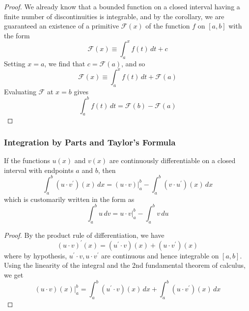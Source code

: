   \begin{proof}
    We already know that a bounded function on a closed interval having a finite number of discontinuities is integrable, and by the corollary, we are guaranteed an existence of a primitive $\mathcal{F}(x)$ of the function $f$ on $[a, b]$ with the form 
    \[\mathcal{F} (x) \equiv \int_a^x f(t)\,dt + c\]
    Setting $x = a$, we find that $c = \mathcal{F}(a)$, and so 
    \[\mathcal{F}(x) \equiv \int_a^x f(t)\,dt + \mathcal{F}(a)\]
    Evaluating $\mathcal{F}$ at $x = b$ gives
    \[\int_a^b f(t)\,dt = \mathcal{F}(b) - \mathcal{F}(a)\]
  \end{proof}

  \subsubsection{Integration by Parts and Taylor's Formula}
  \begin{theorem}
  If the functions $u(x)$ and $v(x)$ are continuously differentiable on a closed interval with endpoints $a$ and $b$, then
  \[\int_a^b (u \cdot v^\prime)(x)\,dx = (u \cdot v)\big|^b_a - \int_a^b (v \cdot u^\prime)(x)\,dx\]
  which is customarily written in the form as
  \[\int_a^b u\,dv = u \cdot v \big|_a^b - \int_a^b v\,du\]
  \end{theorem}
  \begin{proof}
  By the product rule of differentiation, we have
  \[(u \cdot v)^\prime (x) = (u^\prime \cdot v)(x) + (u \cdot v^\prime) (x)\]
  where by hypothesis, $u^\prime \cdot v, u \cdot v^\prime$ are continuous and hence integrable on $[a, b]$. Using the linearity of the integral and the 2nd fundamental theorem of calculus, we get
  \[(u \cdot v) (x) \big|^b_a = \int_a^b (u^\prime \cdot v)(x)\,dx + \int_a^b (u \cdot v^\prime) (x)\,dx\]
  \end{proof}

